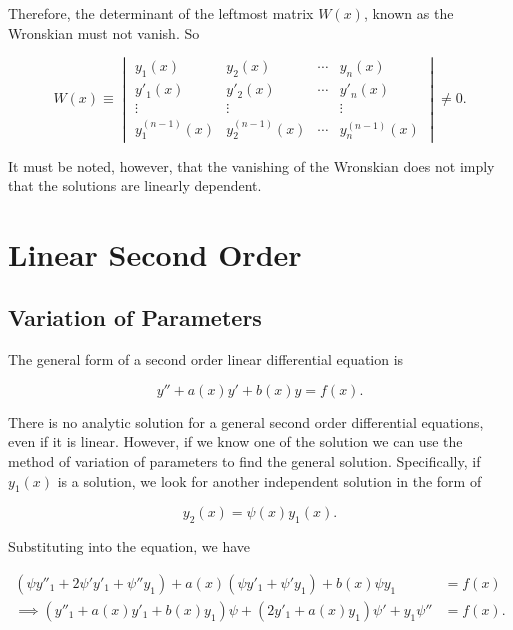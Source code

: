 \documentclass[english,a4paper,12pt]{report}
\begin{document}
Therefore, the determinant of the leftmost matrix \(W(x)\), known as the Wronskian must not vanish. So

\begin{equation}
    W(x) \equiv \begin{vmatrix}
        y_1 (x) & y_2 (x) & \cdots  & y_{n}(x)   \\
        y'_1(x) & y'_2 (x) & \cdots  & y'_{n}(x)   \\
        \vdots  & \vdots  &  & \vdots   \\
        y^{(n-1)}_1(x)  & y^{(n-1)}_2(x)  & \cdots  & y^{(n-1)}_{n} (x)
    \end{vmatrix} \neq 0.
\end{equation}

It must be noted, however, that the vanishing of the Wronskian does not imply that the solutions are linearly dependent.

\section{Linear Second Order}

\subsection{Variation of Parameters}\label{vp} 

The general form of a second order linear differential equation is

\begin{equation}
    y'' + a(x) y' + b(x)y = f(x).
\end{equation}

There is no analytic solution for a general second order differential equations, even if it is linear. However, if we know one of the solution we can use the method of variation of parameters to find the general solution. Specifically, if \(y_1 (x)\) is a solution, we look for another independent solution in the form of

\begin{equation}
    y_{2} (x) = \psi (x) y_{1}(x).   
\end{equation}

Substituting into the equation, we have

\begin{equation}
    \begin{aligned}
     (\psi y''_{1} + 2\psi 'y'_{1} + \psi ''y_{1}) + a(x) (\psi y'_{1} + \psi ' y_{1}) + b(x) \psi y_{1} &= f(x) \\
    \implies ( y''_{1} + a(x) y'_{1} + b(x)y_{1}   ) \psi + (2 y'_{1} + a(x) y_{1}) \psi ' +  y_{1}\psi '' &= f(x). 
    \end{aligned}
\end{equation}
\end{document}
